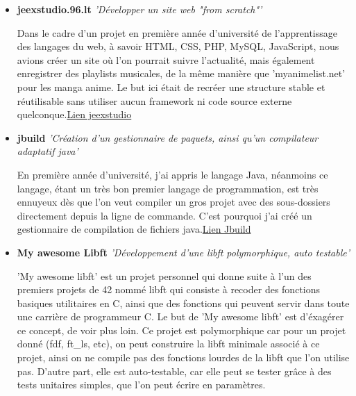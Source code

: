 \documentclass[11pt,a4paper,sans]{moderncv}        %
\begin{document}
\begin{itemize}
	
	\item{\textbf{jeexstudio.96.lt} \textit{'Développer un site web "from scratch"'}
		
		\vspace{3pt}
		
		\small{Dans le cadre d'un projet en première année d'université de l'apprentissage des langages du web, à savoir HTML, CSS, PHP, MySQL, JavaScript, nous avions créer un site où l'on pourrait suivre l'actualité, mais également enregistrer des playlists musicales, de la même manière que 'myanimelist.net' pour les manga anime. Le but ici était de recréer une structure stable et réutilisable sans utiliser aucun framework ni code source externe quelconque.\href{http://jeexstudio.96.lt/Pagepremierevisite/JeexStudio.php}{Lien jeexstudio}}}
	
	\vspace{6pt}
	
	\item{\textbf{jbuild} \textit{'Création d'un gestionnaire de paquets, ainsi qu'un compilateur adaptatif java'}
		
		\vspace{3pt}
		
		\small{En première année d'université, j'ai appris le langage Java, néanmoins ce langage, étant un très bon premier langage de programmation, est très ennuyeux dès que l'on veut compiler un gros projet avec des sous-dossiers directement depuis la ligne de commande. C'est pourquoi j'ai créé un gestionnaire de compilation de fichiers java.\href{https://github.com/FauconFan/jbuild}{Lien Jbuild}}}
	
	\vspace{6pt}
	
	\item{\textbf{My awesome Libft} \textit{'Développement d'une libft polymorphique, auto testable'}
		
		\vspace{3pt}
		
		\small{'My awesome libft' est un projet personnel qui donne suite à l'un des premiers projets de 42 nommé libft qui consiste à recoder des fonctions basiques utilitaires en C, ainsi que des fonctions qui peuvent servir dans toute une carrière de programmeur C. Le but de 'My awesome libft' est d'éxagérer ce concept, de voir plus loin. Ce projet est polymorphique car pour un projet donné (fdf, ft\_ls, etc), on peut construire la libft minimale associé à ce projet, ainsi on ne compile pas des fonctions lourdes de la libft que l'on utilise pas. D'autre part, elle est auto-testable, car elle peut se tester grâce à des tests unitaires simples, que l'on peut écrire en paramètres.}}
	
\end{itemize}
\end{document}
